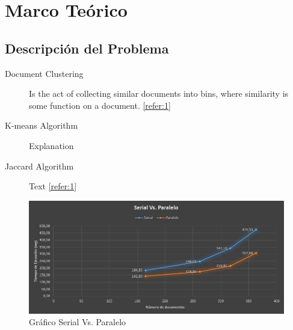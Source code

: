 \documentclass[fleqn,10pt]{SelfArx} %
\begin{document}

\section{Marco Teórico}

\subsection{Descripción del Problema}



\begin{description}
	\item[Document Clustering] Is the act of collecting similar documents into bins, where similarity is some function on a document. \ref{refer:1}
	\item[K-means Algorithm] Explanation
	\item[Jaccard Algorithm] Text \ref{refer:1}
\end{description}



\begin{figure}[ht]\centering %
	\includegraphics[width=\linewidth]{graficoSerialParalelo}
	\caption{Gráfico Serial Vs. Paralelo}
	\label{fig:graficoSerialParalelo}
\end{figure}
\end{document}
